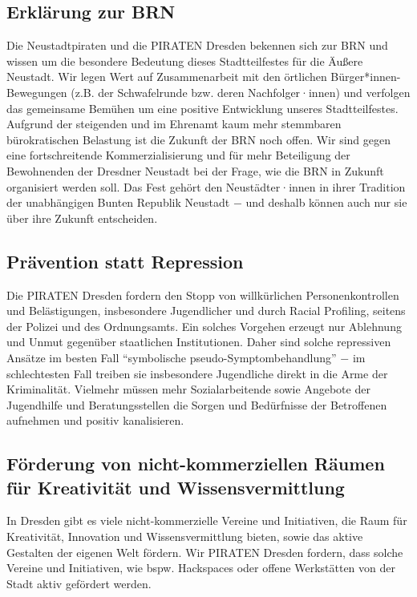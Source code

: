 \documentclass[a4paper, 11pt]{article}
\begin{document}
\subsection{Erklärung zur BRN}
Die Neustadtpiraten und die PIRATEN Dresden bekennen sich zur BRN und wissen um die besondere Bedeutung dieses Stadtteilfestes für die Äußere Neustadt. Wir legen Wert auf Zusammenarbeit mit den örtlichen Bürger*innen-Bewegungen (z.B. der Schwafelrunde bzw. deren Nachfolger·innen) und verfolgen das gemeinsame Bemühen um eine positive Entwicklung unseres Stadtteilfestes. Aufgrund der steigenden und im Ehrenamt kaum mehr stemmbaren bürokratischen Belastung ist die Zukunft der BRN noch offen. Wir sind gegen eine fortschreitende Kommerzialisierung und für mehr Beteiligung der Bewohnenden der Dresdner Neustadt bei der Frage, wie die BRN in Zukunft organisiert werden soll. Das Fest gehört den Neustädter·innen in ihrer Tradition der unabhängigen Bunten Republik Neustadt $-$ und deshalb können auch nur sie über ihre Zukunft entscheiden.



\subsection{Prävention statt Repression}
Die PIRATEN Dresden fordern den Stopp von willkürlichen Personenkontrollen und Belästigungen, insbesondere Jugendlicher und durch Racial Profiling, seitens der Polizei und des Ordnungsamts. Ein solches Vorgehen erzeugt nur Ablehnung und Unmut gegenüber staatlichen Institutionen. Daher sind solche repressiven Ansätze im besten Fall ``symbolische pseudo-Symptombehandlung'' $-$ im schlechtesten Fall treiben sie insbesondere Jugendliche direkt in die Arme der Kriminalität. Vielmehr müssen mehr Sozialarbeitende sowie Angebote der Jugendhilfe und Beratungsstellen die Sorgen und Bedürfnisse der Betroffenen aufnehmen und positiv kanalisieren.


\subsection{Förderung von nicht-kommerziellen Räumen für Kreativität und Wissensvermittlung}
In Dresden gibt es viele nicht-kommerzielle Vereine und Initiativen, die Raum für Kreativität, Innovation und Wissensvermittlung bieten, sowie das aktive Gestalten der eigenen Welt fördern. Wir PIRATEN Dresden fordern, dass solche Vereine und Initiativen, wie bspw. Hackspaces oder offene Werkstätten von der Stadt aktiv gefördert werden.
\end{document}
